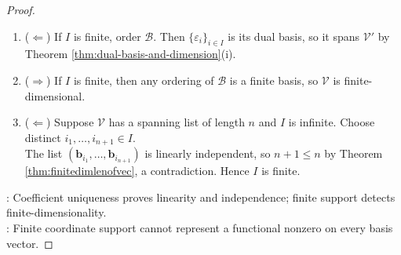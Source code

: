 \begin{proposition}
\begin{proof}
\begin{enumerate}[label=(\roman*)]
By coordinate uniqueness, $(\forall\,\alpha,\beta\in\mathbb{F})(\forall\,\mathbf{v},\mathbf{w}\in\mathcal{V})\,\varphi(\alpha\mathbf{v}+\beta\mathbf{w})=\alpha\varphi(\mathbf{v})+\beta\varphi(\mathbf{w})$, so $\varphi\in\mathcal{V}'$\\
 The equality $(\forall\,i\in I)\,\varphi(\mathbf{b}_i)=1$ holds, whereas every element of $\operatorname{span}\{\varepsilon_i:i\in I\}$ vanishes on all but finitely many $\mathbf{b}_i$.\\
 Thus $\varphi\notin\operatorname{span}\{\varepsilon_i:i\in I\}$, a contradiction, and $\abs{I}<\infty$.
\item[$(iii)$] ($\Leftarrow$) If $I$ is finite, order $\mathcal{B}$. Then $\{\varepsilon_i\}_{i\in I}$ is its dual basis, so it spans $\mathcal{V}'$ by Theorem \ref{thm:dual-basis-and-dimension}(i).
\item[$(iv)$] ($\Rightarrow$) If $I$ is finite, then any ordering of $\mathcal{B}$ is a finite basis, so $\mathcal{V}$ is finite-dimensional.
\item[$(iv)$] ($\Leftarrow$) Suppose $\mathcal{V}$ has a spanning list of length $n$ and $I$ is infinite. Choose distinct $i_1,\ldots,i_{n+1}\in I$.\\
The list $(\mathbf{b}_{i_1},\ldots,\mathbf{b}_{i_{n+1}})$ is linearly independent, so $n+1\leq n$ by Theorem \ref{thm:finitedimlenofvec}, a contradiction. Hence $I$ is finite.
\end{enumerate}
: Coefficient uniqueness proves linearity and independence; finite support detects finite-dimensionality.\\
: Finite coordinate support cannot represent a functional nonzero on every basis vector.
\end{proof}
\end{proposition}

